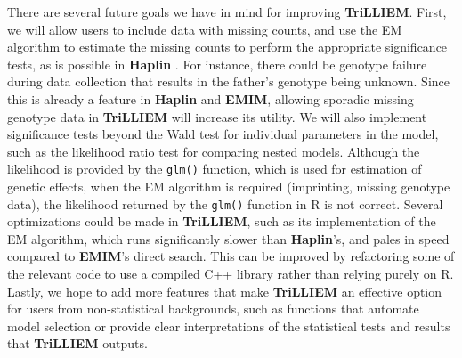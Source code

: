 There are several future goals we have in mind for improving \textbf{TriLLIEM}.
First, we will allow users to include data with missing counts, and use the EM algorithm to estimate the missing counts to perform the appropriate significance tests, as is possible in \textbf{Haplin} \cite{GjesLie06}.
For instance, there could be genotype failure during data collection that results in the father's genotype being unknown.
Since this is already a feature in \textbf{Haplin} and \textbf{EMIM}, allowing sporadic missing genotype data in \textbf{TriLLIEM} will increase its utility.
We will also implement significance tests beyond the Wald test for individual parameters in the model, such as the likelihood ratio test for comparing nested models.
Although the likelihood is provided by the \texttt{glm()} function, which is used for estimation of genetic effects, when the EM algorithm is required (imprinting, missing genotype data), the likelihood returned by the \texttt{glm()} function in \textsf{R} is not correct.
Several optimizations could be made in \textbf{TriLLIEM}, such as its implementation of the EM algorithm, which runs significantly slower than \textbf{Haplin}'s, and pales in speed compared to \textbf{EMIM}'s direct search.
This can be improved by refactoring some of the relevant code to use a compiled C++ library rather than relying purely on R.
Lastly, we hope to add more features that make \textbf{TriLLIEM} an effective option for users from non-statistical backgrounds, such as functions that automate model selection or provide clear interpretations of the statistical tests and results that \textbf{TriLLIEM} outputs.

\vfill
\cleardoublepage

